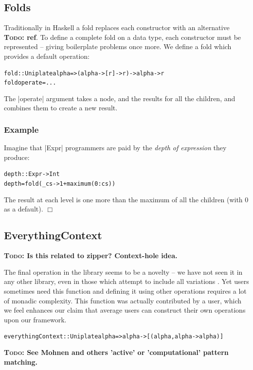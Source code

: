 \documentclass[preprint]{sigplanconf}
\newcounter{exmp}
\newcommand{\yesexample}{\subsubsection*{Example \arabic{exmp}}\refstepcounter{exmp}}
\newcommand{\noexample}{\hfill$\Box$}
\newcommand{\todo}[1]{\textbf{\textsc{Todo:} #1}}
\newenvironment{code}{\begin{alltt}\small}{\end{alltt}}
\newenvironment{example}{\yesexample}{\noexample}
\begin{document}
\subsection{Folds}

Traditionally in Haskell a fold replaces each constructor with an alternative \todo{ref}. To define a complete fold on a data type, each constructor must be represented -- giving boilerplate problems once more. We define a fold which provides a default operation:

\begin{code}
fold :: Uniplate alpha => (alpha -> [r] -> r) -> alpha -> r
fold operate = ...
\end{code}

The |operate| argument takes a node, and the results for all the children, and combines them to create a new result.

\begin{example}
Imagine that |Expr| programmers are paid by the \textit{depth of expression} they produce:

\begin{code}
depth :: Expr -> Int
depth = fold (\_ cs -> 1 + maximum (0:cs))
\end{code}

The result at each level is one more than the maximum of all the children (with 0 as a default).
\end{example}

\subsection{EverythingContext}

\todo{Is this related to zipper? Context-hole idea.}

The final operation in the library seems to be a novelty -- we have not seen it in any other library, even in those which attempt to include all variations \citep{ren:generic_recursion_toolbox}. Yet users sometimes need this function and defining it using other operations requires a lot of monadic complexity. This function was actually contributed by a user, which we feel enhances our claim that average users can construct their own operations upon our framework.

\begin{code}
everythingContext :: Uniplate alpha => alpha -> [(alpha, alpha -> alpha)]
\end{code}

\todo{See Mohnen and others 'active' or 'computational' pattern matching.}
\end{document}
